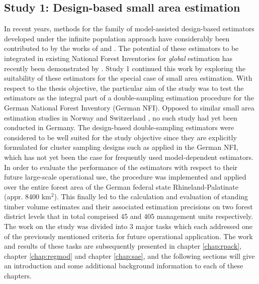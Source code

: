 \subsection{Study 1: Design-based small area estimation}
\label{sec:study1}


In recent years, methods for the family of model-assisted design-based estimators developed under the infinite population approach have considerably been contributed to by the works of \citet{mandallaz1991, mandallaz2008, mandallaz2013a, mandallaz2013c} and \citet{mandallaz2013b}. The potential of these estimators to be integrated in existing National Forest Inventories for \textit{global} estimation has recently been demonstrated by \citet{massey2015_thesis}. Study 1 continued this work by exploring the suitability of these estimators for the special case of small area estimation. With respect to the thesis objective, the particular aim of the study was to test the estimators as the integral part of a double-sampling estimation procedure for the German National Forest Inventory (German NFI). Opposed to similar small area estimation studies in Norway \citep{breidenbach2012} and Switzerland \citep{magnussen2014a, steinmann2013}, no such study had yet been conducted in Germany. The design-based double-sampling estimators were considered to be well suited for the study objective since they are explicitly formulated for cluster sampling designs such as applied in the German NFI, which has not yet been the case for frequently used model-dependent estimators. In order to evaluate the performance of the estimators with respect to their future large-scale operational use, the procedure was implemented and applied over the entire forest area of the German federal state Rhineland-Palatinate (appr. 8400 km$^2$). This finally led to the calculation and evaluation of standing timber volume estimates and their associated estimation precisions on two forest district levels that in total comprised 45 and 405 management units respectively. The work on the study was divided into 3 major tasks which each addressed one of the previously mentioned criteria for future operational application. The work and results of these tasks are subsequently presented in chapter \ref{chap:rpack}, chapter \ref{chap:regmod} and chapter \ref{chap:sae}, and the following sections will give an introduction and some additional background information to each of these chapters.


